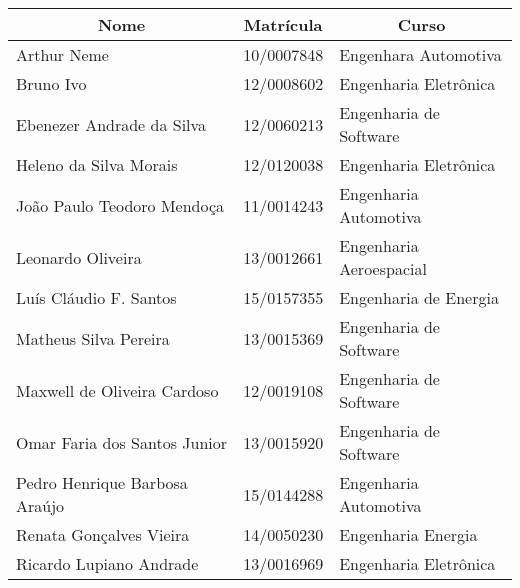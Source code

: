 \begin{resumo}[Autores]

\begin{table}[!h]
\centering
\label{my-label}
\begin{tabular}{|l|l|l|}
\hline
\multicolumn{1}{|c|}{\textbf{Nome}}    & \multicolumn{1}{c|}{\textbf{Matrícula}} & \multicolumn{1}{c|}{\textbf{Curso}} \\ \hline
Arthur Neme        					   & 10/0007848                              & Engenhara Automotiva                \\ \hline
Bruno Ivo        					   & 12/0008602                              & Engenharia Eletrônica                \\ \hline
Ebenezer Andrade da Silva              & 12/0060213                              & Engenharia de Software             \\ \hline
Heleno da Silva Morais                 & 12/0120038                              & Engenharia Eletrônica               \\ \hline
João Paulo Teodoro Mendoça             & 11/0014243                              & Engenharia Automotiva             \\ \hline
Leonardo Oliveira             		   & 13/0012661                              & Engenharia Aeroespacial             \\ \hline
Luís Cláudio F. Santos             	   & 15/0157355                              & Engenharia de Energia             \\ \hline
Matheus Silva Pereira             	   & 13/0015369                              & Engenharia de Software             \\ \hline
Maxwell de Oliveira Cardoso            & 12/0019108                              & Engenharia de Software             \\ \hline
Omar Faria dos Santos Junior           & 13/0015920                              & Engenharia de Software             \\ \hline
Pedro Henrique Barbosa Araújo          & 15/0144288                              & Engenharia Automotiva             \\ \hline
Renata Gonçalves Vieira                & 14/0050230                              & Engenharia Energia             \\ \hline
Ricardo Lupiano Andrade                & 13/0016969                              & Engenharia Eletrônica             \\ \hline
\end{tabular}
\end{table}

\end{resumo}
\pagebreak

